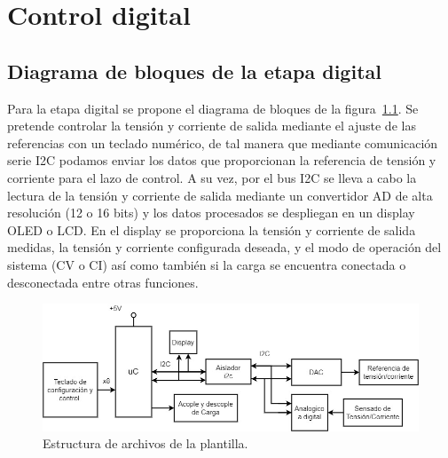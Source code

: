 \chapter{Control digital}

\label{C:Digitalización y control}

\section{Diagrama de bloques de la etapa digital}
Para la etapa digital se propone el diagrama de bloques de la figura~\ref{F:diagrama_digital}. Se pretende controlar la tensión y corriente de salida mediante el ajuste de las referencias con un teclado numérico, de tal manera que mediante comunicación serie I2C podamos enviar los datos que proporcionan la referencia de tensión y corriente para el lazo de control. A su vez, por el bus I2C se lleva a cabo la lectura de la tensión y corriente de salida mediante un convertidor AD de alta resolución (12 o 16 bits) y los datos procesados se despliegan en un display OLED o LCD. En el display se proporciona la tensión y corriente de salida medidas, la tensión y corriente configurada deseada, y el modo de operación del sistema (CV o CI) así como también si la carga se encuentra conectada o desconectada entre otras funciones. 

\begin{figure} [H]
    \centering
    \includegraphics[scale=0.5]{./imagenes/diagrama_digital.jpg}
    \caption{Estructura de archivos de la plantilla.}
    \label{F:diagrama_digital}
\end{figure}

